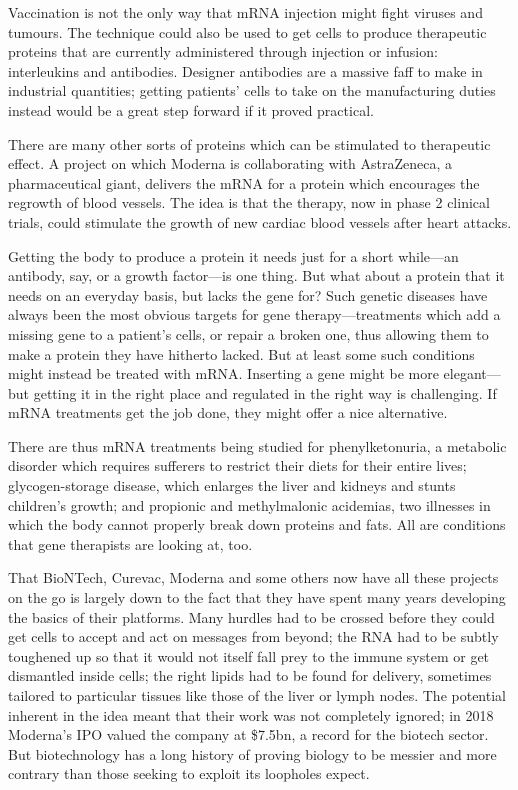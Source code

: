 \documentclass{article}
\begin{document}
Vaccination is not the only way that mRNA injection might fight viruses and tumours. The technique could also be used to get cells to produce therapeutic proteins that are currently administered through injection or infusion: interleukins and antibodies. Designer antibodies are a massive faff to make in industrial quantities; getting patients' cells to take on the manufacturing duties instead would be a great step forward if it proved practical. 

There are many other sorts of proteins which can be stimulated to therapeutic effect. A project on which Moderna is collaborating with AstraZeneca, a pharmaceutical giant, delivers the mRNA for a protein which encourages the regrowth of blood vessels. The idea is that the therapy, now in phase 2 clinical trials, could stimulate the growth of new cardiac blood vessels after heart attacks. 

Getting the body to produce a protein it needs just for a short while---an antibody, say, or a growth factor---is one thing. But what about a protein that it needs on an everyday basis, but lacks the gene for? Such genetic diseases have always been the most obvious targets for gene therapy---treatments which add a missing gene to a patient's cells, or repair a broken one, thus allowing them to make a protein they have hitherto lacked. But at least some such conditions might instead be treated with mRNA. Inserting a gene might be more elegant---but getting it in the right place and regulated in the right way is challenging. If mRNA treatments get the job done, they might offer a nice alternative. 

There are thus mRNA treatments being studied for phenylketonuria, a metabolic disorder which requires sufferers to restrict their diets for their entire lives; glycogen-storage disease, which enlarges the liver and kidneys and stunts children's growth; and propionic and methylmalonic acidemias, two illnesses in which the body cannot properly break down proteins and fats. All are conditions that gene therapists are looking at, too. 

That BioNTech, Curevac, Moderna and some others now have all these projects on the go is largely down to the fact that they have spent many years developing the basics of their platforms. Many hurdles had to be crossed before they could get cells to accept and act on messages from beyond; the RNA had to be subtly toughened up so that it would not itself fall prey to the immune system or get dismantled inside cells; the right lipids had to be found for delivery, sometimes tailored to particular tissues like those of the liver or lymph nodes. The potential inherent in the idea meant that their work was not completely ignored; in 2018 Moderna's IPO valued the company at \$7.5bn, a record for the biotech sector. But biotechnology has a long history of proving biology to be messier and more contrary than those seeking to exploit its loopholes expect. 
\end{document}
